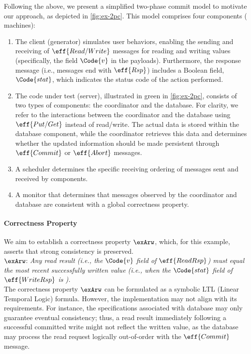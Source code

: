 Following the above, we present a simplified two-phase commit model to
motivate our approach, as depicted in \autoref{fig:ex-2pc}. This model
comprises four components ( machines):
\begin{enumerate} 
    \item The client (generator) simulates user behaviors, enabling the sending
      and receiving of $\eff{Read/Write}$ messages for reading and
      writing values (specifically, the field $\Code{v}$ in the
      payloads). Furthermore, the response message (i.e., messages end
      with $\eff{Rsp}$) includes a Boolean field, $\Code{stat}$, which
      indicates the status code of the action performed.  
    \item The code under test (server), illustrated in green in
      \autoref{fig:ex-2pc}, consists of two types of components: the
      coordinator and the database. For clarity, we refer to
      the interactions between the coordinator and the database using
      $\eff{Put/Get}$ instead of read/write. The actual data is stored
      within the database component, while the coordinator retrieves
      this data and determines whether the updated information should
      be made persistent through $\eff{Commit}$ or $\eff{Abort}$
      messages.
    \item A scheduler determines the specific receiving ordering of messages
      sent and received by components.
    \item A monitor that determines that messages observed by the
      coordinator and database are consistent with a global
      correctness property.
\end{enumerate}


\paragraph{Correctness Property} We aim to establish a correctness property $\exArw$,
which, for this example, asserts that strong consistency is preserved.\\[-.8em]

$\exArw$: \textit{Any read result (i.e., the $\Code{v}$ field of
  $\eff{ReadRsp}$) must equal the most recent successfully written
  value (i.e., when the $\Code{stat}$ field of $\eff{WriteRsp}$ is
  ).}\\[-.8em]

The correctness property $\exArw$ can be formulated as a symbolic LTL
(Linear Temporal Logic) formula. However, the implementation may not
align with its requirements. For instance, the specifications
associated with database may only guarantee eventual consistency;
thus, a read result immediately following a successful committed write
might not reflect the written value, as the database may process the
read request logically out-of-order with the $\eff{Commit}$ message.


